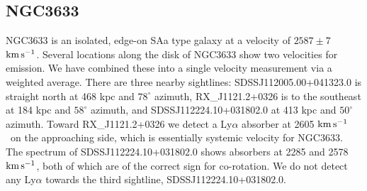 \documentclass[iop]{emulateapj-rtx4}
\newcommand{\kms}{$\rm km\, s^{-1}$}
\begin{document}
%



\subsection{NGC3633}
NGC3633 is an isolated, edge-on SAa type galaxy at a velocity of $2587 \pm 7$ \kms. Several locations along the disk of NGC3633 show two velocities for emission. We have combined these into a single velocity measurement via a weighted average. 
There are three nearby sightlines: SDSSJ112005.00+041323.0 is straight north at 468 kpc and $78^{\circ}$ azimuth, RX\_J1121.2+0326 is to the southeast at 184 kpc and $58^{\circ}$ azimuth, and SDSSJ112224.10+031802.0 at 413 kpc and $50^{\circ}$ azimuth. Toward RX\_J1121.2+0326 we detect a Ly$\alpha$ absorber at 2605 \kms~on the approaching side, which is essentially systemic velocity for NGC3633. The spectrum of SDSSJ112224.10+031802.0 shows absorbers at 2285 and 2578 \kms, both of which are of the correct sign for co-rotation. We do not detect any Ly$\alpha$ towards the third sightline, SDSSJ112224.10+031802.0.




%
%
%
%
%
\end{document}
